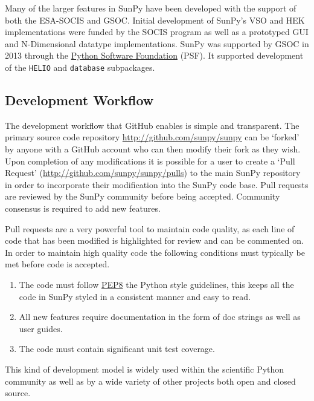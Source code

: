 Many of the larger features in SunPy have been developed 
with the support of both the ESA-SOCIS and GSOC. 
Initial development of SunPy's VSO and HEK 
implementations were funded by the SOCIS program as well as a prototyped GUI 
and N-Dimensional datatype implementations. SunPy was supported by GSOC in 2013 
through the \href{http://www.python.org/psf/}{Python Software Foundation} (PSF). It supported development of the 
\texttt{HELIO} and 
\texttt{database} subpackages.

\subsection{Development Workflow}
The development workflow that GitHub enables is simple and transparent. The 
primary source code repository \url{http://github.com/sunpy/sunpy} can be 
`forked' by anyone with a GitHub account who can then modify their fork as they 
wish. Upon completion of any modifications it is possible for a user to create 
a `Pull Request' (\url{http://github.com/sunpy/sunpy/pulls}) to the main SunPy 
repository in order to incorporate their modification into the SunPy code base. 
Pull requests are reviewed by the SunPy community before being accepted. Community consensus
is required to add new features.

Pull requests are a very powerful tool to maintain code quality, as each line 
of code that has been modified is highlighted for review and can be commented on. 
In order to maintain high quality code the following conditions must typically be met 
before code is accepted.

\begin{enumerate}
	\item  The code must follow 	
	\href{http://www.python.org/dev/peps/pep-0008/}{PEP8} the Python style 
	guidelines, this keeps all the code in SunPy styled in a consistent manner and easy to read.
	
	\item All new features require documentation in the form of doc strings as well as user
	guides. 
	
	\item The code must contain significant unit test coverage.
\end{enumerate}

This kind of development model is widely used within the scientific Python 
community as well as by a wide variety of other projects both open and closed 
source.
